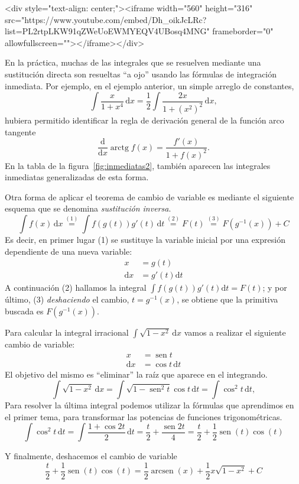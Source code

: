 \begin{rawhtml}
<div style="text-align: center;"><iframe width="560" height="316" src="https://www.youtube.com/embed/Dh_oikJcLRc?list=PL2rtpLKW91qZWeUoEWMYEQV4UBosq4MNG" frameborder="0" allowfullscreen=""></iframe></div>
\end{rawhtml}


En la práctica, muchas de las integrales que se resuelven mediante una sustitución directa son resueltas ``a ojo'' usando las fórmulas de integración inmediata.
Por ejemplo, en el ejemplo anterior, un simple arreglo de constantes,
\[
\displaystyle\int\dfrac{x}{1+x^4}\,\mathrm dx = \dfrac{1}{2}\displaystyle\int\dfrac{2x}{1+(x^2)^2}\,\mathrm dx,
\]
hubiera permitido identificar la regla de derivación general de la función arco tangente
\[
\frac{\mathrm d}{\mathrm dx}\operatorname{arctg} f(x) =\frac{f'(x)}{1+f(x)^2}.
\]
En la tabla de la figura~\ref{fig:inmediatas2}, también aparecen las integrales inmediatas generalizadas de esta forma.

Otra forma de aplicar el teorema de cambio de variable es mediante el siguiente esquema que se denomina \emph{sustitución inversa}.
\[
\displaystyle\int f(x)\,\mathrm dx
\stackrel{(1)}{=} \displaystyle\int f(g(t))g'(t)\,\mathrm dt
\stackrel{(2)}{=} F(t)
\stackrel{(3)}{=} F(g^{-1}(x)) + C
\]
Es decir, en primer lugar (1) se sustituye la variable inicial por una expresión dependiente de una nueva variable:
\begin{align*}
x & = g(t) \\
\mathrm dx & = g'(t)\mathrm dt
\end{align*}
A continuación (2) hallamos la integral $\displaystyle\int f(g(t))g'(t)\mathrm dt = F(t)$; y por
último, (3) \emph{deshaciendo} el cambio, $t = g^{-1}(x)$, se obtiene que la primitiva buscada es
$F(g^{-1}(x))$. 

\begin{ejemplo}\label{4intirrac}
Para calcular la integral irracional $\displaystyle\int \sqrt{1-x^2}\,\mathrm dx$ vamos a realizar el siguiente cambio de variable:
%
\begin{align*}
x  & = \operatorname{sen} t \\
\mathrm dx & = \cos t\,\mathrm dt
\end{align*}
El objetivo del mismo es ``eliminar'' la raíz que aparece en el integrando.
\[
\displaystyle\int \sqrt{1-x^2}\,\mathrm dx = \displaystyle\int \sqrt{1-\operatorname{sen}^2 t}\cos t\,\mathrm dt = \displaystyle\int \cos^2 t\,\mathrm dt,
\]
Para resolver la última integral podemos utilizar la fórmulas que aprendimos en el primer tema, para transformar las potencias de funciones trigonométricas.
\[
\displaystyle\int \cos^2 t\,\mathrm dt = \displaystyle\int\dfrac{1+\cos 2t}{2}\,\mathrm dt
= \dfrac{t}{2}+\dfrac{\operatorname{sen} 2t}{4}
= \dfrac{t}{2}+\dfrac12\operatorname{sen}(t)\cos(t)
\]

Y finalmente, deshacemos el cambio de variable
\begin{equation}
\dfrac{t}{2}+\dfrac12\operatorname{sen}(t)\cos(t)
= \dfrac12\operatorname{arcsen}(x)+\dfrac12 x \sqrt{1-x^2}+C\tag*{\fej}
\end{equation}
\end{ejemplo}

